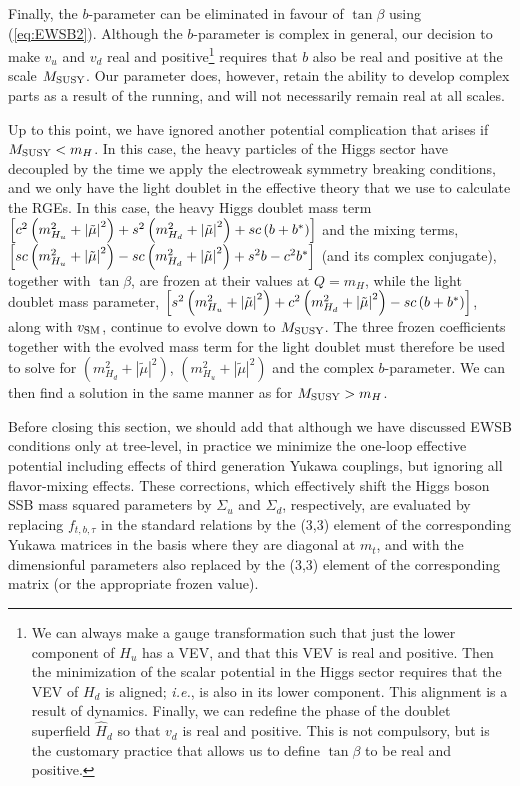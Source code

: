 Finally, the $b$-parameter can be eliminated in favour of $\tan{\beta}$
using (\ref{eq:EWSB2}). Although the $b$-parameter is complex in
general, our decision to make $v_{u}$ and $v_{d}$ real and
positive\footnote{We can always make a gauge transformation such that
just the lower component of $H_u$ has a VEV, and that this VEV is real
and positive. Then the minimization of the scalar potential in the Higgs
sector requires that the VEV of $H_d$ is aligned; \textit{i.e.}, is also
in its lower component. This alignment is a result of dynamics. Finally,
we can redefine the phase of the doublet superfield ${\hat{H}}_d$ so
that $v_d$ is real and positive. This is not compulsory, but is the
customary practice that allows us to define $\tan\beta$ to be real and
positive.} requires that $b$ also be real and positive at the scale
$M_{\mathrm{SUSY}}$. Our parameter does, however, retain the ability to develop
complex parts as a result of the running, and will not necessarily
remain real at all scales.

Up to this point, we have ignored another potential complication that
arises if $M_{\mathrm{SUSY}}<m_{H}$. In this case, the heavy particles of the Higgs
sector have decoupled by the time we apply the electroweak symmetry
breaking conditions, and we only have the light doublet in the effective
theory that we use to calculate the RGEs. In this case, the heavy Higgs
doublet mass term
$\left[c^{2}\left(m^{2}_{H_{u}}+\left|\tilde{\mu}\right|^{2}\right)+s^{2}\left(m^{2}_{H_{d}}+\left|\tilde{\mu}\right|^{2}\right)+sc\left(b+b^{*}\right)\right]$
and the mixing terms,
$\left[sc\left(m^{2}_{H_{u}}+\left|\tilde{\mu}\right|^{2}\right)-sc\left(m^{2}_{H_{d}}+\left|\tilde{\mu}\right|^{2}\right)+s^{2}b-c^{2}b^{*}\right]$
(and its complex conjugate), together with $\tan\beta$, are frozen at
their values at $Q=m_H$, while the light doublet mass parameter,
$\left[s^{2}\left(m^{2}_{H_{u}}+\left|\tilde{\mu}\right|^{2}\right)+c^{2}\left(m^{2}_{H_{d}}+\left|\tilde{\mu}\right|^{2}\right)-sc\left(b+b^{*}\right)\right]$,
along with $v_{\rm SM}$, continue to evolve down to $M_{\rm SUSY}$. The
three frozen coefficients together with the evolved mass term for the
light doublet must therefore be used to solve for
$\left(m^{2}_{H_{d}}+\left|\tilde{\mu}\right|^{2}\right)$,
$\left(m^{2}_{H_{u}}+\left|\tilde{\mu}\right|^{2}\right)$ and the
complex $b$-parameter. We can then find a solution in the same manner as
for $M_{\mathrm{SUSY}}>m_H$.

Before closing this section, we should add that although we have
discussed EWSB conditions only at tree-level, in practice we minimize the
one-loop effective potential including effects of third generation
Yukawa couplings, but ignoring all flavor-mixing effects. These
corrections, which effectively shift the Higgs boson SSB mass squared
parameters by $\Sigma_u$ and $\Sigma_d$, respectively, are evaluated by
replacing $f_{t,b,\tau}$ in the standard relations by the (3,3) element
of the corresponding Yukawa matrices in the basis where they are
diagonal at $m_{t}$, and with the dimensionful parameters also replaced
by the (3,3) element of the corresponding matrix (or the appropriate
frozen value).


